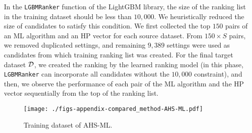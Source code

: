 %
%
In the {\tt LGBMRanker} function of the LightGBM library, the size of the ranking list in the training dataset should be less than $10,000$.
%
We heuristically reduced the size of candidates to satisfy this condition.
%
We first collected the top $150$ pairs of an ML algorithm and an HP vector for each source dataset. 
%
From $150 \times S$ pairs, we removed duplicated settings, and remaining $9,389$ settings were used as candidates from which training ranking list was created.
%
For the final target dataset ${\mathcal D}$, we created the ranking by the learned ranking model (in this phase, {\tt LGBMRanker} can incorporate all candidates without the $10,000$ constraint), and then, we observe the performance of each pair of the ML algorithm and the HP vector sequentially from the top of the ranking list.




\begin{figure}[t]
 \centering
 \texttt{[image: ./figs-appendix-compared\_method-AHS-ML.pdf]}
 \caption{
 Training dataset of AHS-ML.
 }
  \label{fig:AHS-ML}
\end{figure}



